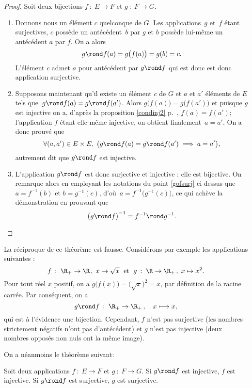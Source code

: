 \begin{proof}
Soit deux bijections $f\::\;E\to F$ et $g\::\;F\to G$. %
\begin{enumerate}
\item\label{gofsurj} Donnons nous un élément $c$ quelconque de $G$. Les applications~$g$ et~$f$ étant surjectives, $c$ possède un antécédent~$b$ par $g$  et $b$ possède lui-même un antécédent $a$ par $f$. On a alors 
\[g\rond f(a) =g\bigl(f(a)\bigr)=g(b)=c.\]
L'élément $c$ admet $a$ pour antécédent par $g\rond f$ qui est donc  est donc application surjective.
\item Supposons maintenant qu'il existe un élément $c$ de $G$ et $a$ et $a'$ éléments de $E$ tels que~$g\rond f(a)=g\rond f(a')$. Alors  $g\bigl(f(a)\bigr)=g\bigl(f(a')\bigr)$ et puisque $g$ est injective on a, d'après la proposition \eqref{condinj2} p.~\pageref{condinj2},  $f(a) = f(a')$; l'application $f$ étant elle-même injective, on obtient finalement~$a=a'$. On a donc prouvé que 
\[\forall(a,a')\in E\times E, \;\bigl(g\rond f(a)= g\rond f(a')\implies a=a'\bigr),\]
autrement dit que $g\rond f$ est injective.
\item L'application $g\rond f$ est donc surjective et injective : elle est bijective. On remarque alors en employant les notations du point \ref{gofsurj} ci-dessus \mbox{que $a=f^{-1}(b)$} et $b=g^{-1}(c)$, \mbox{d'où $a=f^{-1}\bigl(g^{-1}(c)\bigr)$}, ce qui achève la démonstration en prouvant que 
\[{\bigl(g\rond f\bigr)}^{-1}=f^{-1}\rond g^{-1}.\qedhere\]
\end{enumerate}
\end{proof}

\begin{remark}
La réciproque de ce théorème est fausse. Considérons par exemple les applications suivantes :
\[
f\::\;\R_+\to\R\,,\; x\mapsto \sqrt{x}\;\text{ et }\;g\::\;\R\to\R_+\,,\; x\mapsto x^2.
\]
Pour tout réel $x$ positif, on a $g\bigl(f(x)\bigr)=\bigl(\sqrt{x}\bigr)^2=x$, par définition de la racine carrée. Par conséquent, on a 
\[g\rond f \::\;\R_+\to\R_+\,,\quad x\longmapsto x,\]
qui est à l'évidence une bijection. Cependant, $f$ n'est pas surjective (les nombres strictement négatifs n'ont pas d'antécédent) et $g$ n'est pas injective (deux nombres opposés non nuls ont la même image).
\end{remark}

On a néanmoins le théorème suivant:
\begin{thm}
Soit deux applications $f\::\;E\to F$ et $g\::\;F\to G$. Si $g\rond f$ est injective, $f$ est injective. Si $g\rond f$ est surjective, $g$ est surjective.
\end{thm}

